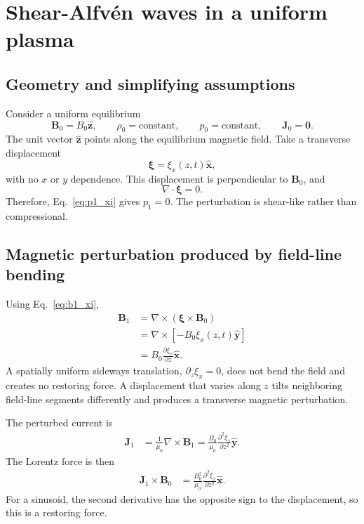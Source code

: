 \section{Shear-Alfv\'en waves in a uniform plasma}
\label{sec:uniform_alfven}

\subsection{Geometry and simplifying assumptions}
Consider a uniform equilibrium
\begin{equation}
\mathbf B_0=B_0\widehat{\mathbf z},
\qquad
\rho_0=\text{constant},
\qquad
p_0=\text{constant},
\qquad
\mathbf J_0=\mathbf 0.
\end{equation}
The unit vector $\widehat{\mathbf z}$ points along the equilibrium magnetic field. Take a transverse displacement
\begin{equation}
\boldsymbol\xi=\xi_x(z,t)\widehat{\mathbf x},
\end{equation}
with no $x$ or $y$ dependence. This displacement is perpendicular to $\mathbf B_0$, and
\begin{equation}
\nabla\cdot\boldsymbol\xi=0.
\end{equation}
Therefore, Eq.~\eqref{eq:p1_xi} gives $p_1=0$. The perturbation is shear-like rather than compressional.

\subsection{Magnetic perturbation produced by field-line bending}
Using Eq.~\eqref{eq:b1_xi},
\begin{align}
\mathbf B_1
&=\nabla\times(\boldsymbol\xi\times\mathbf B_0)\\
&=\nabla\times\left[-B_0\xi_x(z,t)\widehat{\mathbf y}\right]\\
&=B_0\frac{\partial\xi_x}{\partial z}\widehat{\mathbf x}.
\label{eq:b1_uniform_alfven}
\end{align}
A spatially uniform sideways translation, $\partial_z\xi_x=0$, does not bend the field and creates no restoring force. A displacement that varies along $z$ tilts neighboring field-line segments differently and produces a transverse magnetic perturbation.

The perturbed current is
\begin{align}
\mathbf J_1
&=\frac{1}{\mu_0}\nabla\times\mathbf B_1
=\frac{B_0}{\mu_0}\frac{\partial^2\xi_x}{\partial z^2}\widehat{\mathbf y}.
\end{align}
The Lorentz force is then
\begin{align}
\mathbf J_1\times\mathbf B_0
&=\frac{B_0^2}{\mu_0}\frac{\partial^2\xi_x}{\partial z^2}
\widehat{\mathbf x}.
\end{align}
For a sinusoid, the second derivative has the opposite sign to the displacement, so this is a restoring force.


